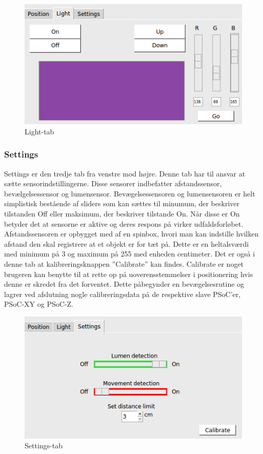 \begin{figure}[H]
\centering
\includegraphics[width=0.9\linewidth]{0_Filer/Figuer/Light.png}
\caption{Light-tab}
\label{fig:GUI Light}
\end{figure}

\subsubsection{Settings}
Settings er den tredje tab fra venstre mod højre. Denne tab har til ansvar at sætte sensorindstillingerne. Disse sensorer indbefatter afstandssensor, bevælgelsessensor og lumensensor. Bevægelsessensoren og lumensensoren er helt simplistisk bestående af sliders som kan sættes til minumum, der beskriver tilstanden Off eller maksimum, der beskriver tilstande On. Når disse er On betyder det at sensorne er aktive og deres respons på virker udfaldsforløbet. Afstandssensoren er opbygget med af en spinbox, hvori man kan indstille hvilken afstand den skal registrere at et objekt er for tæt på. Dette er en heltalsværdi med minimum på 3 og maximum på 255 med enheden centimeter. Det er også i denne tab at kalibreringsknappen ”Calibrate” kan findes. Calibrate er noget brugeren kan benytte til at rette op på uoverensstemmelser i positionering hvis denne er skredet fra det forventet. Dette påbegynder en bevægelsesrutine og lagrer ved afslutning nogle calibreringsdata på de respektive slave PSoC'er, PSoC-XY og PSoC-Z.

\begin{figure}[H]
\centering
\includegraphics[width=0.9\linewidth]{0_Filer/Figuer/Settings.png}
\caption{Settings-tab}
\label{fig:GUI Position}
\end{figure}


